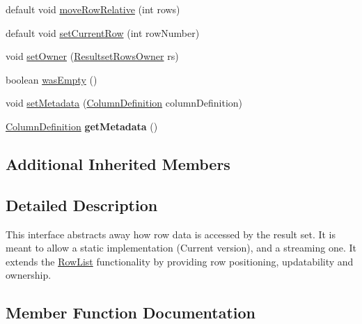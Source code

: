 \begin{DoxyCompactItemize}
\item 
default void \mbox{\hyperlink{interfacecom_1_1mysql_1_1cj_1_1protocol_1_1_resultset_rows_a81d7635ad38c59a3160e3edc46327bac}{move\+Row\+Relative}} (int rows)
\item 
default void \mbox{\hyperlink{interfacecom_1_1mysql_1_1cj_1_1protocol_1_1_resultset_rows_a813efe790e18424a02b692a3f9213446}{set\+Current\+Row}} (int row\+Number)
\item 
void \mbox{\hyperlink{interfacecom_1_1mysql_1_1cj_1_1protocol_1_1_resultset_rows_a2ab1ce5f29431a54097987b58fbb942c}{set\+Owner}} (\mbox{\hyperlink{interfacecom_1_1mysql_1_1cj_1_1protocol_1_1_resultset_rows_owner}{Resultset\+Rows\+Owner}} rs)
\item 
boolean \mbox{\hyperlink{interfacecom_1_1mysql_1_1cj_1_1protocol_1_1_resultset_rows_a46258b5b85f7536a54d62054403e6cf8}{was\+Empty}} ()
\item 
void \mbox{\hyperlink{interfacecom_1_1mysql_1_1cj_1_1protocol_1_1_resultset_rows_a5121e355be1da17a4085068bb5611fb0}{set\+Metadata}} (\mbox{\hyperlink{interfacecom_1_1mysql_1_1cj_1_1protocol_1_1_column_definition}{Column\+Definition}} column\+Definition)
\item 
\mbox{\label{interfacecom_1_1mysql_1_1cj_1_1protocol_1_1_resultset_rows_a8c98725ac82f59abb6eb000489624ce6}} 
\mbox{\hyperlink{interfacecom_1_1mysql_1_1cj_1_1protocol_1_1_column_definition}{Column\+Definition}} {\bfseries get\+Metadata} ()
\end{DoxyCompactItemize}
\subsection*{Additional Inherited Members}


\subsection{Detailed Description}
This interface abstracts away how row data is accessed by the result set. It is meant to allow a static implementation (Current version), and a streaming one. It extends the \mbox{\hyperlink{}{Row\+List}} functionality by providing row positioning, updatability and ownership. 

\subsection{Member Function Documentation}
\mbox{\label{interfacecom_1_1mysql_1_1cj_1_1protocol_1_1_resultset_rows_a0af5754ee23ac440b3ce31543ed3c339}} 
